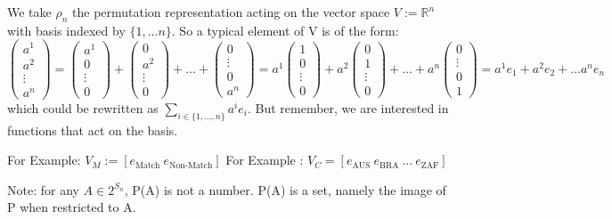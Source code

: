 \documentclass{article}
\theoremstyle{definition}
\begin{document}
We take $\rho_n $ the permutation representation acting on the vector space $V := \mathbb{R}^n$ with basis indexed by $ \{1, \dots n\} $. So a typical element of V is of the form: 
\[ \begin{pmatrix} a^1 \\ a^2 \\ \vdots \\ a^n \end{pmatrix} = \begin{pmatrix} a^1 \\ 0 \\ \vdots \\ 0 \end{pmatrix} + \begin{pmatrix} 0 \\ a^2 \\ \vdots \\ 0 \end{pmatrix} + \dots + \begin{pmatrix} 0 \\  \vdots \\ 0\\ a^n \end{pmatrix} = a^1\begin{pmatrix} 1 \\ 0 \\ \vdots \\ 0 \end{pmatrix} + a^2\begin{pmatrix} 0 \\ 1 \\ \vdots \\ 0 \end{pmatrix} + \dots + a^n\begin{pmatrix} 0 \\  \vdots \\ 0\\ 1\end{pmatrix} = a^1 e_1 + a^2 e_2 + \dots a^n e_n \]which could be rewritten as $\sum_{i \in \{1,\dots,n\} } a^i e_i$. But remember, we are interested in functions that act on the basis.

For Example: $V_{M} := [ e_{\text{Match}} \: e_{\text{Non-Match}} ]$
For Example  : $V_{C} = [ e_{\text{AUS}} \: e_{\text{BRA}} \: \dots \: e_{\text{ZAF}} ]$




Note: for any $A \in 2^{S_n} $, P(A) is not a number. P(A) is a set, namely the image of P when restricted to A. 
\end{document}

